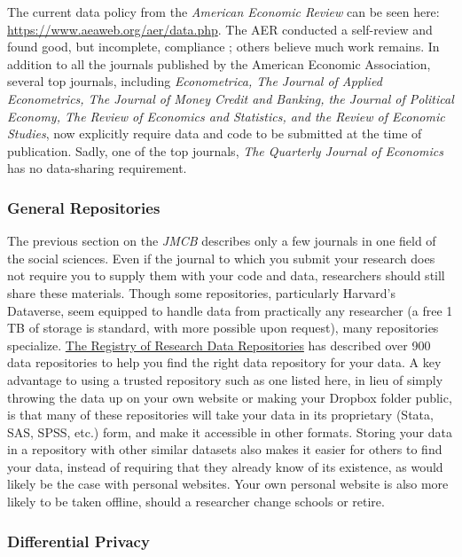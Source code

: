 \documentclass[12pt] {article}
\begin{document}
The current data policy from the \emph{American Economic Review} can be
seen here: \url{https://www.aeaweb.org/aer/data.php}. The AER conducted a self-review and
found good, but incomplete, compliance \citep{glandon_report_2010}; others believe much work remains. In addition to all
the journals published by the American Economic Association, several top journals, including \emph{Econometrica, The Journal of Applied
Econometrics, The Journal of Money Credit and Banking, the Journal of
Political Economy, The Review of Economics and Statistics, and the
Review of Economic Studies}, now explicitly require data and code to be
submitted at the time of publication. Sadly, one of the top journals, \textit{The Quarterly Journal of Economics} has no data-sharing requirement.



\subsubsection{General Repositories}\label{general-repositories}

The previous section on the \emph{JMCB} describes only a few journals in
one field of the social sciences. Even if the journal to which you
submit your research does not require you to supply them with your code
and data, researchers should still share these materials. Though some
repositories, particularly Harvard's Dataverse, seem equipped to handle
data from practically any researcher (a free 1 TB of storage is
standard, with more possible upon request), many repositories specialize. \href{http://www.re3data.org}{The Registry of Research Data Repositories}
has described over 900 data repositories to help you find the right data
repository for your data. A key advantage to using a trusted repository
such as one listed here, in lieu of simply throwing the data up on your
own website or making your Dropbox folder public, is that many of these
repositories will take your data in its proprietary (Stata, SAS, SPSS,
etc.) form, and make it accessible in other formats. Storing your data in a repository with other similar datasets also makes it easier for others to find your data, instead of requiring that they already know of its existence, as would likely be the case with personal websites. Your own personal website is also more likely to be taken offline, should a researcher change schools or retire.

\subsubsection{Differential Privacy}\label{differential-privacy}
\end{document}
